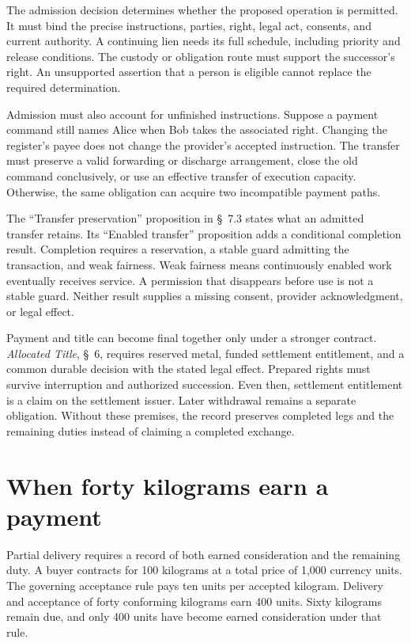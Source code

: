 \documentclass{momentum}
\begin{document}
The admission decision determines whether the proposed operation is permitted. It must bind the precise instructions, parties, right, legal act, consents, and current authority. A continuing lien needs its full schedule, including priority and release conditions. The custody or obligation route must support the successor's right. An unsupported assertion that a person is eligible cannot replace the required determination.

Admission must also account for unfinished instructions. Suppose a payment command still names Alice when Bob takes the associated right. Changing the register's payee does not change the provider's accepted instruction. The transfer must preserve a valid forwarding or discharge arrangement, close the old command conclusively, or use an effective transfer of execution capacity. Otherwise, the same obligation can acquire two incompatible payment paths.

The ``Transfer preservation'' proposition in \S~7.3 states what an admitted transfer retains. Its ``Enabled transfer'' proposition adds a conditional completion result. Completion requires a reservation, a stable guard admitting the transaction, and weak fairness. Weak fairness means continuously enabled work eventually receives service. A permission that disappears before use is not a stable guard. Neither result supplies a missing consent, provider acknowledgment, or legal effect.

Payment and title can become final together only under a stronger contract. \emph{Allocated Title}, \S~6, requires reserved metal, funded settlement entitlement, and a common durable decision with the stated legal effect. Prepared rights must survive interruption and authorized succession. Even then, settlement entitlement is a claim on the settlement issuer. Later withdrawal remains a separate obligation. Without these premises, the record preserves completed legs and the remaining duties instead of claiming a completed exchange.

\section{When forty kilograms earn a payment}

Partial delivery requires a record of both earned consideration and the remaining duty. A buyer contracts for 100 kilograms at a total price of 1,000 currency units. The governing acceptance rule pays ten units per accepted kilogram. Delivery and acceptance of forty conforming kilograms earn 400 units. Sixty kilograms remain due, and only 400 units have become earned consideration under that rule.
\end{document}
